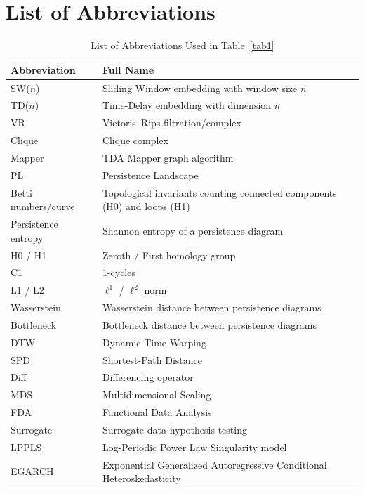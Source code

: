 \documentclass[11pt,reqno]{amsart}
\numberwithin{equation}{section} %
\begin{document}
\section*{List of Abbreviations}\label{List of Abbreviations}
\begin{table}[htbp]
\centering
\caption{List of Abbreviations Used in Table~\ref{tab1}}
\label{tab:abbrev}
\small
\begin{tabular}{ll}
\toprule
\textbf{Abbreviation} & \textbf{Full Name} \\
\midrule
SW($n$)             & Sliding Window embedding with window size $n$ \\
TD($n$)             & Time-Delay embedding with dimension $n$ \\
VR                  & Vietoris--Rips filtration/complex \\
Clique              & Clique complex \\
Mapper              & TDA Mapper graph algorithm \\
PL                  & Persistence Landscape \\
Betti numbers/curve & Topological invariants counting connected components (H0) and loops (H1) \\
Persistence entropy & Shannon entropy of a persistence diagram \\
H0 / H1             & Zeroth / First homology group \\
C1                  & 1-cycles \\
L1 / L2             & $\ell^1$ / $\ell^2$ norm \\
Wasserstein         & Wasserstein distance between persistence diagrams \\
Bottleneck          & Bottleneck distance between persistence diagrams \\
DTW                 & Dynamic Time Warping \\
SPD                 & Shortest-Path Distance \\
Diff                & Differencing operator \\
MDS                 & Multidimensional Scaling \\
FDA                 & Functional Data Analysis \\
Surrogate           & Surrogate data hypothesis testing \\
LPPLS               & Log-Periodic Power Law Singularity model \\
EGARCH              & Exponential Generalized Autoregressive Conditional Heteroskedasticity \\

\end{tabular}
\end{table}
\end{document}
